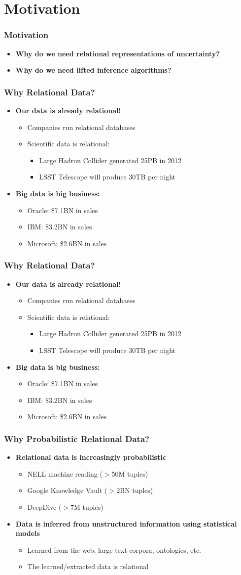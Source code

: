 \documentclass{beamer}
\newcommand{\bi}{\begin{itemize}}
\newcommand{\ei}{\end{itemize}}
\newcommand{\ii}{\item}
\begin{document}


\section{Motivation} 

\begin{frame}
\frametitle{Motivation}
\bi
\ii \textbf{Why do we need relational representations of uncertainty?}
\ei

\bi
\ii \textbf{Why do we need lifted inference algorithms?}
\ei
\end{frame}

\begin{frame}
\frametitle{Why Relational Data?}
\bi
\ii \textbf{Our data is already relational!}
\bi
\ii Companies run relational databases
\ii Scientific data is relational:
\bi
\ii Large Hadron Collider generated 25PB in 2012 
\ii LSST Telescope will produce 30TB per night
\ei
\ei
\ei

\bi
\ii \textbf{Big data is big business:}
\bi
\ii Oracle: \$7.1BN in sales
\ii IBM: \$3.2BN in sales
\ii Microsoft: \$2.6BN in sales
\ei
\ei
\end{frame}

\begin{frame}
\frametitle{Why Relational Data?}
\bi
\ii \textbf{Our data is already relational!}
\bi
\ii Companies run relational databases
\ii Scientific data is relational:
\bi
\ii Large Hadron Collider generated 25PB in 2012 
\ii LSST Telescope will produce 30TB per night
\ei
\ei
\ei

\bi
\ii \textbf{Big data is big business:}
\bi
\ii Oracle: \$7.1BN in sales
\ii IBM: \$3.2BN in sales
\ii Microsoft: \$2.6BN in sales
\ei
\ei
\end{frame}

\begin{frame}
\frametitle{Why Probabilistic Relational Data?}
\bi
\ii \textbf{Relational data is increasingly probabilistic}
\bi
\ii NELL machine reading ($>$50M tuples)
\ii Google Knowledge Vault ($>$2BN tuples)
\ii DeepDive ($>$7M tuples)
\ei
\ei

\bi
\ii \textbf{Data is inferred from unstructured information using statistical models}
\bi
\ii Learned from the web, large text corpora, ontologies, etc.
\ii The learned/extracted data is relational
\ei
\ei
\end{frame}
\end{document}
